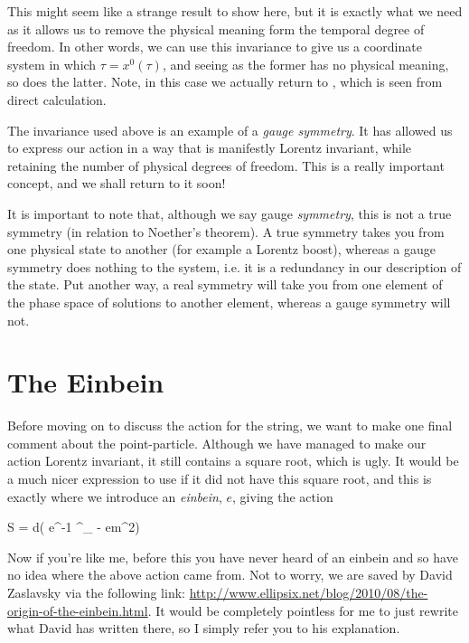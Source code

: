 This might seem like a strange result to show here, but it is exactly what we need as it allows us to remove the physical meaning form the temporal degree of freedom. In other words, we can use this invariance to give us a coordinate system in which $\tau=x^0(\tau)$, and seeing as the former has no physical meaning, so does the latter. Note, in this case we actually return to , which is seen from direct calculation.

The invariance used above is an example of a \textit{gauge symmetry}. It has allowed us to express our action in a way that is manifestly Lorentz invariant, while retaining the number of physical degrees of freedom. This is a really important concept, and we shall return to it soon! 

\br 
It is important to note that, although we say gauge \textit{symmetry}, this is not a true symmetry (in relation to Noether's theorem). A true symmetry takes you from one physical state to another (for example a Lorentz boost), whereas a gauge symmetry does nothing to the system, i.e. it is a redundancy in our description of the state. Put another way, a real symmetry will take you from one element of the phase space of solutions to another element, whereas a gauge symmetry will not.
\er 

\section{The Einbein}

Before moving on to discuss the action for the string, we want to make one final comment about the point-particle. Although we have managed to make our action Lorentz invariant, it still contains a square root, which is ugly. It would be a much nicer expression to use if it did not have this square root, and this is exactly where we introduce an \textit{einbein}, $e$, giving the action 

\be 
\label{eqn:PointActionEinbein}
    S = \int d\tau \big( e^{-1} ^{\mu}_{\mu} - em^2\big)
\ee 

Now if you're like me, before this you have never heard of an einbein and so have no idea where the above action came from. Not to worry, we are saved by David Zaslavsky via the following link: \href{http://www.ellipsix.net/blog/2010/08/the-origin-of-the-einbein.html}{http://www.ellipsix.net/blog/2010/08/the-origin-of-the-einbein.html}. It would be completely pointless for me to just rewrite what David has written there, so I simply refer you to his explanation. 

